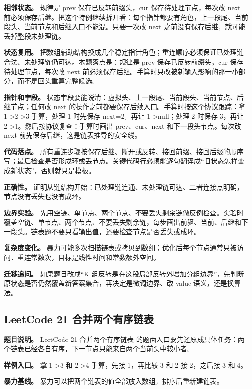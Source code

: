 \textbf{相邻状态。} 规律是 prev 保存已反转前缀头，cur 保存待处理节点，每次改 next 前必须保存后继。把这个特例继续拆开看：每个指针都要有角色，上一段尾、当前段头、当前节点和后继入口不能混。只要一次改 next 之前没有保存后继，就可能丢掉整段未处理链。

\textbf{状态复用。} 把数组辅助结构换成几个稳定指针角色；重连顺序必须保证已处理链合法、未处理链仍可达。本题落点是：规律是 prev 保存已反转前缀头，cur 保存待处理节点，每次改 next 前必须保存后继。手算时只改被新输入影响的那一小部分，而不是回头重算完整候选。

\textbf{指针和字段。} 状态字段要能说清：虚拟头、上一段尾、当前段头、当前节点、后继节点；任何改 next 的操作之前都要保存后续入口。手算时按这个协议跟踪：拿 1->2->3 手算，处理 1 时先保存 next=2，再让 1->null；处理 2 时保存 3，再让 2->1。然后按协议复查：手算时画出 prev、cur、next 和下一段头节点。每次改 next 前先保存后继，这是链表推导的安全线。

\textbf{代码落点。} 所有重连步骤按保存后继、断开或反转、接回前缀、接回后缀的顺序写；最后检查是否形成环或丢节点。关键代码行必须能逐句翻译成“旧状态怎样变成新状态”，否则就只是模板。

\textbf{正确性。} 证明从链结构开始：已处理链连通、未处理链可达、二者连接点明确，节点没有丢失也没有成环。

\textbf{边界实验。} 先用空链、单节点、两个节点、不要丢失剩余链做反例检查。实验时覆盖空链、单节点、两个节点、不要丢失剩余链，每步画出前驱、当前、后继和下一段头。链表题不要只看输出值，还要检查节点是否丢失或成环。

\textbf{复杂度变化。} 暴力可能多次扫描链表或拷贝到数组；优化后每个节点通常只被访问、重连常数次，目标是线性时间和常数额外空间。

\textbf{迁移追问。} 如果题目改成“K 组反转是在这段局部反转外增加分组边界”，先判断原状态是否仍然覆盖新答案集合，再决定是微调边界、改 value 语义，还是换算法。

\subsection{LeetCode 21 合并两个有序链表}

\textbf{题目说明。} LeetCode 21 合并两个有序链表 的题面入口要先还原成具体任务：两个链表已经各自有序，下一节点只能来自两个当前头中较小者。

\textbf{样例入口。} 拿 1->3 和 2->4 手算，先接 1，再比较 3 和 2 接 2，之后接 3 和 4。

\textbf{暴力基线。} 暴力可以把两个链表的值全部放入数组，排序后重新建链表。

